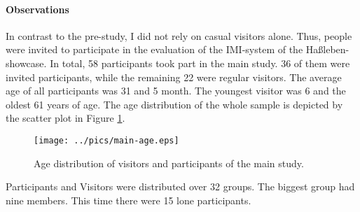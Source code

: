 \paragraph{Observations} In contrast to the pre-study, I did not rely on casual visitors alone. Thus, people were invited to participate in the evaluation of the \ac{IMI}-system of the Haßleben-showcase. In total, 58 participants took part in the main study. 36 of them were invited participants, while the remaining 22 were regular visitors. The average age of all participants was 31 and 5 month. The youngest visitor was 6 and the oldest 61 years of age. The age distribution of the whole sample is depicted by the scatter plot in Figure \ref{fig:main_study_ages}. 
\begin{figure}[H]%
\texttt{[image: ../pics/main-age.eps]}%
\caption{Age distribution of visitors and participants of the main study.}%
\label{fig:main_study_ages} %
\end{figure}

Participants and Visitors were distributed over 32 groups. The biggest group had nine members. This time there were 15 lone participants.

